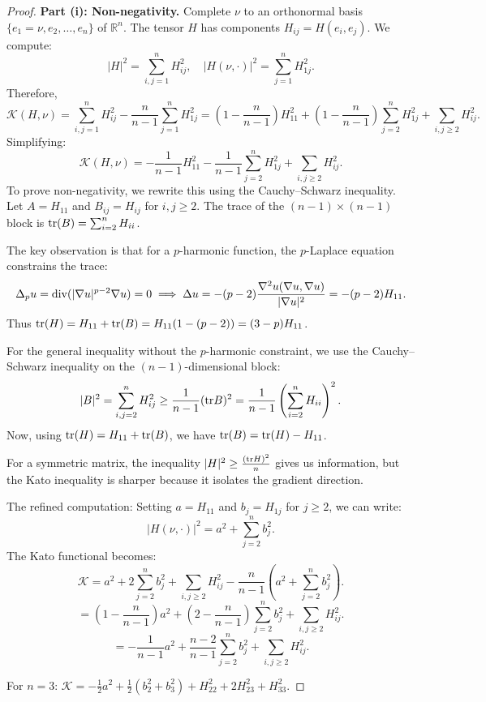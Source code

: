 \begin{proof}
\textbf{Part (i): Non-negativity.}
Complete $\nu$ to an orthonormal basis $\{e_1 = \nu, e_2, \ldots, e_n\}$ of $\mathbb{R}^n$. The tensor $H$ has components $H_{ij} = H(e_i, e_j)$. We compute:
\[
    |H|^2 = \sum_{i,j=1}^n H_{ij}^2, \quad |H(\nu, \cdot)|^2 = \sum_{j=1}^n H_{1j}^2.
\]
Therefore,
\[
    \mathcal{K}(H, \nu) = \sum_{i,j=1}^n H_{ij}^2 - \frac{n}{n-1} \sum_{j=1}^n H_{1j}^2 = \left(1 - \frac{n}{n-1}\right) H_{11}^2 + \left(1 - \frac{n}{n-1}\right) \sum_{j=2}^n H_{1j}^2 + \sum_{i,j \ge 2} H_{ij}^2.
\]
Simplifying:
\[
    \mathcal{K}(H, \nu) = -\frac{1}{n-1} H_{11}^2 - \frac{1}{n-1} \sum_{j=2}^n H_{1j}^2 + \sum_{i,j \ge 2} H_{ij}^2.
\]
To prove non-negativity, we rewrite this using the Cauchy--Schwarz inequality. Let $A = H_{11}$ and $B_{ij} = H_{ij}$ for $i, j \ge 2$. The trace of the $(n-1) \times (n-1)$ block is $\mathrm{tr}(B) = \sum_{i=2}^n H_{ii}$.

The key observation is that for a $p$-harmonic function, the $p$-Laplace equation constrains the trace:
\[
    \Delta_p u = \mathrm{div}(|\nabla u|^{p-2} \nabla u) = 0 \implies \Delta u = -(p-2) \frac{\nabla^2 u(\nabla u, \nabla u)}{|\nabla u|^2} = -(p-2) H_{11}.
\]
Thus $\mathrm{tr}(H) = H_{11} + \mathrm{tr}(B) = H_{11}(1 - (p-2)) = (3-p) H_{11}$.

For the general inequality without the $p$-harmonic constraint, we use the Cauchy--Schwarz inequality on the $(n-1)$-dimensional block:
\[
    |B|^2 = \sum_{i,j=2}^n H_{ij}^2 \ge \frac{1}{n-1} (\mathrm{tr} B)^2 = \frac{1}{n-1} \left( \sum_{i=2}^n H_{ii} \right)^2.
\]
Now, using $\mathrm{tr}(H) = H_{11} + \mathrm{tr}(B)$, we have $\mathrm{tr}(B) = \mathrm{tr}(H) - H_{11}$.

For a symmetric matrix, the inequality $|H|^2 \ge \frac{(\mathrm{tr} H)^2}{n}$ gives us information, but the Kato inequality is sharper because it isolates the gradient direction.

The refined computation: Setting $a = H_{11}$ and $b_j = H_{1j}$ for $j \ge 2$, we can write:
\[
    |H(\nu, \cdot)|^2 = a^2 + \sum_{j=2}^n b_j^2.
\]
The Kato functional becomes:
\[
    \mathcal{K} = a^2 + 2\sum_{j=2}^n b_j^2 + \sum_{i,j \ge 2} H_{ij}^2 - \frac{n}{n-1}\left(a^2 + \sum_{j=2}^n b_j^2\right).
\]
\[
    = \left(1 - \frac{n}{n-1}\right) a^2 + \left(2 - \frac{n}{n-1}\right) \sum_{j=2}^n b_j^2 + \sum_{i,j \ge 2} H_{ij}^2.
\]
\[
    = -\frac{1}{n-1} a^2 + \frac{n-2}{n-1} \sum_{j=2}^n b_j^2 + \sum_{i,j \ge 2} H_{ij}^2.
\]

For $n = 3$: $\mathcal{K} = -\frac{1}{2} a^2 + \frac{1}{2} (b_2^2 + b_3^2) + H_{22}^2 + 2H_{23}^2 + H_{33}^2$.


\end{proof}

